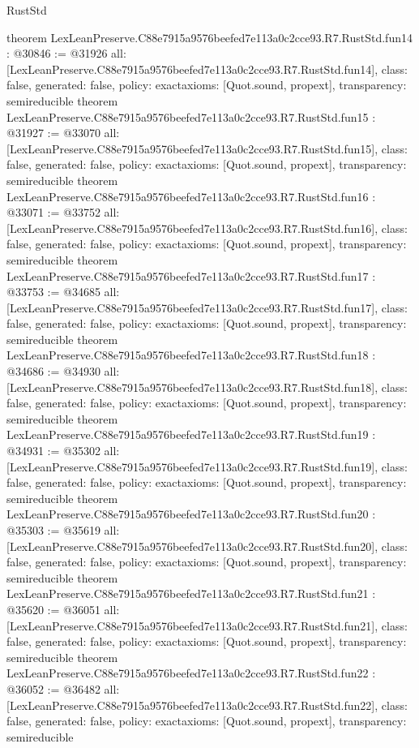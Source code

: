 \begin{lexlean}{RustStd}
\begin{coremodule}
{}
theorem LexLeanPreserve.C88e7915a9576beefed7e113a0c2cce93.R7.RustStd.fun14 : @30846 := @31926 {
  all: [LexLeanPreserve.C88e7915a9576beefed7e113a0c2cce93.R7.RustStd.fun14],
  class: false,
  generated: false,
  policy: exact{axioms: [Quot.sound, propext]},
  transparency: semireducible
}
theorem LexLeanPreserve.C88e7915a9576beefed7e113a0c2cce93.R7.RustStd.fun15 : @31927 := @33070 {
  all: [LexLeanPreserve.C88e7915a9576beefed7e113a0c2cce93.R7.RustStd.fun15],
  class: false,
  generated: false,
  policy: exact{axioms: [Quot.sound, propext]},
  transparency: semireducible
}
theorem LexLeanPreserve.C88e7915a9576beefed7e113a0c2cce93.R7.RustStd.fun16 : @33071 := @33752 {
  all: [LexLeanPreserve.C88e7915a9576beefed7e113a0c2cce93.R7.RustStd.fun16],
  class: false,
  generated: false,
  policy: exact{axioms: [Quot.sound, propext]},
  transparency: semireducible
}
theorem LexLeanPreserve.C88e7915a9576beefed7e113a0c2cce93.R7.RustStd.fun17 : @33753 := @34685 {
  all: [LexLeanPreserve.C88e7915a9576beefed7e113a0c2cce93.R7.RustStd.fun17],
  class: false,
  generated: false,
  policy: exact{axioms: [Quot.sound, propext]},
  transparency: semireducible
}
theorem LexLeanPreserve.C88e7915a9576beefed7e113a0c2cce93.R7.RustStd.fun18 : @34686 := @34930 {
  all: [LexLeanPreserve.C88e7915a9576beefed7e113a0c2cce93.R7.RustStd.fun18],
  class: false,
  generated: false,
  policy: exact{axioms: [Quot.sound, propext]},
  transparency: semireducible
}
theorem LexLeanPreserve.C88e7915a9576beefed7e113a0c2cce93.R7.RustStd.fun19 : @34931 := @35302 {
  all: [LexLeanPreserve.C88e7915a9576beefed7e113a0c2cce93.R7.RustStd.fun19],
  class: false,
  generated: false,
  policy: exact{axioms: [Quot.sound, propext]},
  transparency: semireducible
}
theorem LexLeanPreserve.C88e7915a9576beefed7e113a0c2cce93.R7.RustStd.fun20 : @35303 := @35619 {
  all: [LexLeanPreserve.C88e7915a9576beefed7e113a0c2cce93.R7.RustStd.fun20],
  class: false,
  generated: false,
  policy: exact{axioms: [Quot.sound, propext]},
  transparency: semireducible
}
theorem LexLeanPreserve.C88e7915a9576beefed7e113a0c2cce93.R7.RustStd.fun21 : @35620 := @36051 {
  all: [LexLeanPreserve.C88e7915a9576beefed7e113a0c2cce93.R7.RustStd.fun21],
  class: false,
  generated: false,
  policy: exact{axioms: [Quot.sound, propext]},
  transparency: semireducible
}
theorem LexLeanPreserve.C88e7915a9576beefed7e113a0c2cce93.R7.RustStd.fun22 : @36052 := @36482 {
  all: [LexLeanPreserve.C88e7915a9576beefed7e113a0c2cce93.R7.RustStd.fun22],
  class: false,
  generated: false,
  policy: exact{axioms: [Quot.sound, propext]},
  transparency: semireducible
}
\end{coremodule}
\end{lexlean}
